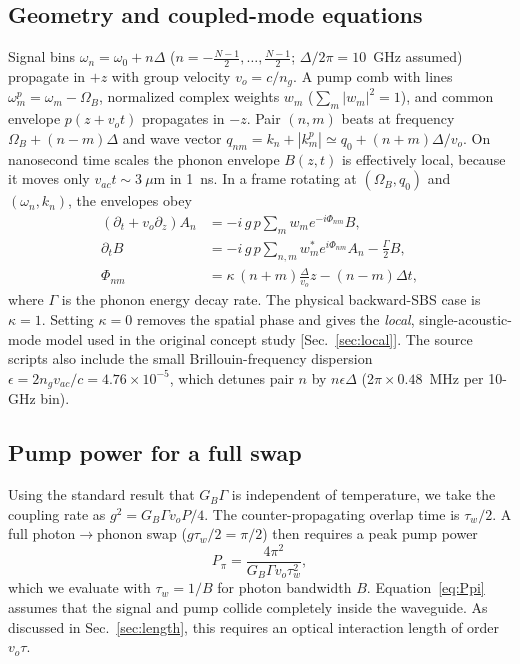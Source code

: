 \documentclass[reprint,amsmath,amssymb,aps,prapplied,superscriptaddress,floatfix]{revtex4-2}
\begin{document}
\subsection{Geometry and coupled-mode equations}
Signal bins $\omega_n=\omega_0+n\Delta$ ($n=-\tfrac{N-1}{2},\dots,\tfrac{N-1}{2}$; $\Delta/2\pi=10$~GHz assumed) propagate in $+z$ with group velocity $v_o=c/n_g$. A pump comb with lines $\omega^p_m=\omega_m-\Omega_B$, normalized complex weights $w_m$ ($\sum_m|w_m|^2=1$), and common envelope $p(z+v_ot)$ propagates in $-z$. Pair $(n,m)$ beats at frequency $\Omega_B+(n-m)\Delta$ and wave vector $q_{nm}=k_n+|k^p_m|\simeq q_0+(n+m)\Delta/v_o$. On nanosecond time scales the phonon envelope $B(z,t)$ is effectively local, because it moves only $v_{ac}t\sim 3~\mu$m in 1~ns. In a frame rotating at $(\Omega_B,q_0)$ and $(\omega_n,k_n)$, the envelopes obey
\begin{align}
(\partial_t+v_o\partial_z)A_n &= -i\,g\,p\sum_m w_m e^{-i\Phi_{nm}}B,\label{eq:A}\\
\partial_t B &= -i\,g\,p\sum_{n,m} w_m^{*}e^{i\Phi_{nm}}A_n-\tfrac{\Gamma}{2}B,\label{eq:B}\\
\Phi_{nm}&=\kappa\,(n+m)\frac{\Delta}{v_o}z-(n-m)\Delta t,\label{eq:phi}
\end{align}
where $\Gamma$ is the phonon energy decay rate. The physical backward-SBS case is $\kappa=1$. Setting $\kappa=0$ removes the spatial phase and gives the \emph{local}, single-acoustic-mode model used in the original concept study [Sec.~\ref{sec:local}]. The source scripts also include the small Brillouin-frequency dispersion $\epsilon=2n_gv_{ac}/c=4.76\times10^{-5}$, which detunes pair $n$ by $n\epsilon\Delta$ (2$\pi\times0.48$~MHz per 10-GHz bin).

\subsection{Pump power for a full swap}
Using the standard result that $G_B\Gamma$ is independent of temperature, we take the coupling rate as $g^2=G_B\Gamma v_oP/4$. The counter-propagating overlap time is $\tau_w/2$. A full photon$\to$phonon swap ($g\tau_w/2=\pi/2$) then requires a peak pump power
\begin{equation}
P_\pi=\frac{4\pi^2}{G_B\Gamma v_o\tau_w^2},\label{eq:Ppi}
\end{equation}
which we evaluate with $\tau_w=1/B$ for photon bandwidth $B$. Equation~\eqref{eq:Ppi} assumes that the signal and pump collide completely inside the waveguide. As discussed in Sec.~\ref{sec:length}, this requires an optical interaction length of order $v_o\tau$.
\end{document}
